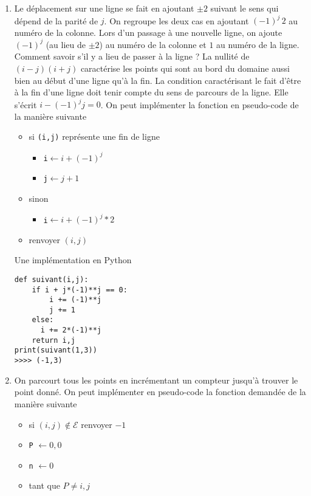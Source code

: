 \begin{enumerate}
\begin{enumerate}
\item Le déplacement sur une ligne se fait en ajoutant $\pm 2$ suivant le sens qui dépend de la parité de $j$. On regroupe les deux cas en ajoutant $(-1)^{j}\,2$ au numéro de la colonne.\newline
Lors d'un passage à une nouvelle ligne, on ajoute $(-1)^j$ (au lieu de $\pm 2$) au numéro de la colonne et $1$ au numéro de la ligne.\newline
Comment savoir s'il y a lieu de passer à la ligne ? La nullité de $(i-j)(i+j)$ caractérise les points qui sont au bord du domaine aussi bien au début d'une ligne qu'à la fin. La condition caractérisant le fait d'être à la fin d'une ligne doit tenir compte du sens de parcours de la ligne. Elle s'écrit $i - (-1)^jj=0$.\newline
On peut implémenter la fonction en pseudo-code de la manière suivante
\begin{itemize}
  \item si \verb|(i,j)| représente une fin de ligne
  \begin{itemize}
    \item \verb|i|$\longleftarrow i+(-1)^j$
    \item  \verb|j|$\longleftarrow j+1$
  \end{itemize}
  \item sinon
  \begin{itemize}
    \item \verb|i|$\longleftarrow i+(-1)^j*2$
  \end{itemize}
  \item renvoyer $(i,j)$
\end{itemize}
Une implémentation en Python
\begin{verbatim}
def suivant(i,j):
    if i + j*(-1)**j == 0:
        i += (-1)**j
        j += 1
    else:
      i += 2*(-1)**j
    return i,j
print(suivant(1,3))
>>>> (-1,3)
\end{verbatim}
\item  On parcourt tous les points en incrémentant un compteur jusqu'à trouver le point donné. On peut implémenter en pseudo-code la fonction demandée de la manière suivante
\begin{itemize}
  \item si $(i,j)\not\in\mathcal{E}$ renvoyer $-1$
  \item \verb|P| $\longleftarrow 0,0$
  \item \verb|n| $\longleftarrow 0$
  \item tant que $P \neq i,j$
  \begin{itemize}

\end{itemize}
\end{itemize}
\end{enumerate}
\end{enumerate}
